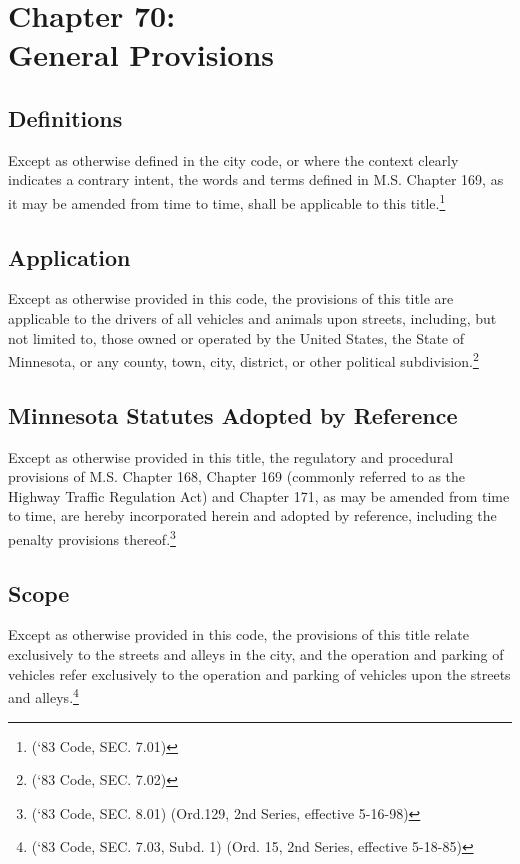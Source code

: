 \chapter*{Chapter 70: \\
	General Provisions}
    \vfill
    \minitoc
    \pagebreak

\section{Definitions}
Except as otherwise defined in the city code, or where the context clearly indicates a contrary intent, the words and terms defined in M.S. Chapter 169, as it may be amended from time to time, shall be applicable to this title.\footnote{(‘83 Code, SEC. 7.01)}

\section{Application}
Except as otherwise provided in this code, the provisions of this title are applicable to the drivers of all vehicles and animals upon streets, including, but not limited to, those owned or operated by the United States, the State of Minnesota, or any county, town, city, district, or other political subdivision.\footnote{(‘83 Code, SEC. 7.02)}

\section{Minnesota Statutes Adopted by Reference}
Except as otherwise provided in this title, the regulatory and procedural provisions of M.S. Chapter 168, Chapter 169 (commonly referred to as the Highway Traffic Regulation Act) and Chapter 171, as may be amended from time to time, are hereby incorporated herein and adopted by reference, including the penalty provisions thereof.\footnote{(‘83 Code, SEC. 8.01) (Ord.129, 2nd Series, effective 5-16-98)}

\section{Scope}
Except as otherwise provided in this code, the provisions of this title relate exclusively to the streets and alleys in the city, and the operation and parking of vehicles refer exclusively to the operation and parking of vehicles upon the streets and alleys.\footnote{(‘83 Code, SEC. 7.03, Subd. 1) (Ord. 15, 2nd Series, effective 5-18-85)}

